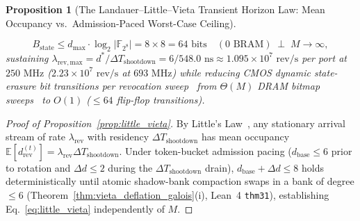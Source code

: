 \documentclass[10pt,twocolumn]{article}
\theoremstyle{spectralthm}
\newtheorem{proposition}[theorem]{Proposition}
\begin{document}
\begin{proposition}[The Landauer--Little--Vieta Transient Horizon Law: Mean Occupancy vs.\ Admission-Paced Worst-Case Ceiling]
\begin{enumerate}
  \begin{equation}
  \label{eq:little_vieta}
  B_{\mathrm{state}} \le d_{\max} \cdot \log_2\bigl|\mathbb{F}_{2^8}\bigr| = 8 \times 8 = 64\text{~bits}\quad(0\text{~BRAM}) \;\perp\; M \to \infty,
  \end{equation}
  sustaining $\lambda_{\mathrm{rev,max}} = d^* / \Delta T_{\mathrm{shootdown}} = 6 / 548.0\text{~ns} \approx 1.095 \times 10^7\text{~rev/s}$ per port at $250\text{~MHz}$ ($2.23 \times 10^7\text{~rev/s}$ at $693\text{~MHz}$) while reducing CMOS dynamic state-erasure bit transitions per revocation sweep~\cite{landauer1961irreversibility} from $\Theta(M)$ DRAM bitmap sweeps~\cite{filardo2020cornucopia,filardo2024cornucopiareloaded} to $O(1)$ ($\le 64$ flip-flop transitions).
\end{enumerate}
\end{proposition}
\begin{proof}[Proof of Proposition~\ref{prop:little_vieta}]
By Little's Law~\cite{little1961proof}, any stationary arrival stream of rate $\lambda_{\mathrm{rev}}$ with residency $\Delta T_{\mathrm{shootdown}}$ has mean occupancy $\mathbb{E}[d_{\mathrm{rev}}^{(t)}] = \lambda_{\mathrm{rev}}\Delta T_{\mathrm{shootdown}}$. Under token-bucket admission pacing ($d_{\mathrm{base}} \le 6$ prior to rotation and $\Delta d \le 2$ during the $\Delta T_{\mathrm{shootdown}}$ drain), $d_{\mathrm{base}} + \Delta d \le 8$ holds deterministically until atomic shadow-bank compaction swaps in a bank of degree $\le 6$ (Theorem~\ref{thm:vieta_deflation_galois}(i), Lean~4 \texttt{thm31}), establishing Eq.~\eqref{eq:little_vieta} independently of $M$.
\end{proof}
\end{document}
